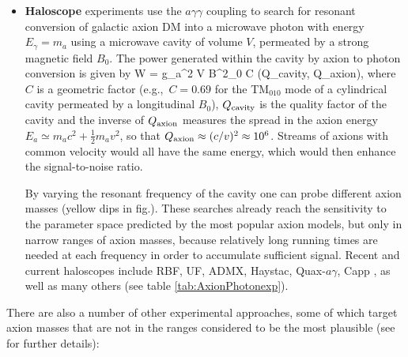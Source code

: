 \begin{itemize}
Observations of the Sun can also be used to impose constraints on axions in a different mass range, $m_a \approx 10$ keV. 
For these masses, a significant fraction of axions thermally produced in the solar core would possess a speed below the escape velocity and would remain gravitationally bound to the Sun, thereby accumulating in a {\bf solar axion basin}, eventually decaying into $X$-rays outside the Sun~\cite{axionsolarbasin}. 
$X$-ray observations imply the constraint $g_{a\gamma\gamma}\circa{<}{\rm few}~10^{-13}/\GeV$ (not shown in fig.).

\item[$-$] {\bf Haloscope} experiments \cite{Sikivie:1983ip} use the $a\gamma\gamma$ coupling to search for resonant
conversion of galactic axion DM into a microwave photon with energy
$E_\gamma=m_a$ using a microwave cavity of volume $V$,
permeated by a strong magnetic field $B_0$.
The power generated within the cavity by axion to photon conversion is given by
\beq W = g_{a\gamma\gamma}^2 V B^2_0  C \min (Q_{\rm cavity}, Q_{\rm axion}),
\eeq
where $C$ is a geometric factor (e.g.,\ $C=0.69$ for the TM$_{010}$ mode of
a cylindrical cavity permeated by a longitudinal $B_0$),
$Q_{\rm cavity}$ is the quality factor of the cavity and the inverse of
$Q_{\rm axion}$ measures the spread in the axion energy $E_a \simeq m_a c^2 + \frac{1}{2}m_a v^2$, so that
$Q_{\rm axion} \approx  (c/v)^2\approx 10^6$.
Streams of axions with common velocity would all have the same energy, which would then enhance the signal-to-noise ratio.

By varying the resonant frequency of the cavity one can probe different axion masses
(yellow dips in fig.). These searches already reach the sensitivity to the parameter space predicted by the most popular axion models,
but only in narrow ranges of axion masses, because relatively long running times are needed at each frequency in order to accumulate sufficient signal.
Recent and current haloscopes include {\sc RBF, UF, ADMX, Haystac, Quax-$a\gamma$, Capp} \cite{RBF,ADMX,HAYSTAC,QUAX,CAPP}, as well as many others (see table \ref{tab:AxionPhotonexp}).


\end{itemize}
There are also a number of other experimental approaches, 
some of which target axion masses that are not  in the ranges considered to be the most plausible
(see \cite{axionreviews} for further details):
